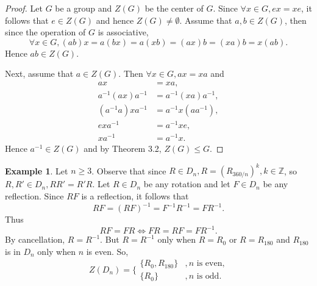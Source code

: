 \documentclass{article}
\theoremstyle{definition}
\newtheorem{example}{Example}[section]
\begin{document}
    \begin{proof}
        Let $G$ be a group and $Z(G)$ be the center of $G$. Since $\forall x \in G, ex = xe$, it follows that $e \in Z(G)$ and hence $Z(G) \neq \emptyset$. Assume that $a,b \in Z(G)$, then since the operation of $G$ is associative,
        \begin{equation*}
            \forall x \in G, (ab)x = a(bx) = a(xb) = (ax)b = (xa)b = x(ab).
        \end{equation*}
        Hence $ab \in Z(G)$.
        
        Next, assume that $a \in Z(G)$. Then $\forall x \in G, ax = xa$ and
        \begin{align*}
            ax &= xa, \\
            a^{-1}(ax)a^{-1} &= a^{-1}(xa)a^{-1}, \\
            (a^{-1}a)xa^{-1} &= a^{-1}x(aa^{-1}), \\
            exa^{-1} &= a^{-1}xe, \\
            xa^{-1} &= a^{-1}x.
        \end{align*}
        Hence $a^{-1} \in Z(G)$ and by Theorem 3.2, $Z(G) \leq G$.
    \end{proof}
    
    \begin{example}
        Let $n \geq 3$. Observe that since $R \in D_n, R = (R_{360/n})^k, k \in \mathbb{Z}$, so $R,R' \in D_n, RR'=R'R$. Let $R \in D_n$ be any rotation and let $F \in D_n$ be any reflection. Since $RF$ is a reflection, it follows that
        \begin{equation*}
            RF = (RF)^{-1} = F^{-1}R^{-1} = FR^{-1}.
        \end{equation*}
        Thus
        \begin{equation*}
            RF = FR \iff FR = RF = FR^{-1}.
        \end{equation*}
        By cancellation, $R = R^{-1}$. But $R = R^{-1}$ only when $R=R_0$ or $R=R_{180}$ and $R_{180}$ is in $D_n$ only when $n$ is even. So,
        \begin{equation*}
            Z(D_n) = \bigg\{ \begin{matrix}
               \{R_0,R_{180}\} & ,n \text{ is even,} \\
               \{R_0\} & ,n \text{ is odd.}
            \end{matrix}
        \end{equation*}
    \end{example}
    
\end{document}
